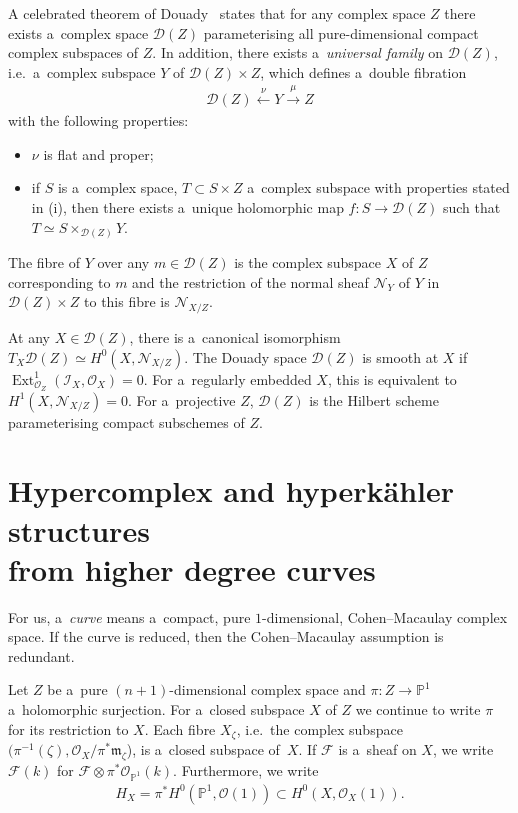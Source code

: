 \documentclass[11pt]{article}
\numberwithin{equation}{section}
\begin{document}
A celebrated theorem of Douady~\cite{Dou} states that for any complex space $Z$ there exists a~complex space
${\mathcal{D}}(Z)$ parameterising all pure-dimensional compact complex subspaces of $Z$.
In addition, there exists a~{\em universal family} on ${\mathcal{D}}(Z)$, i.e.\
a~complex subspace $Y$ of ${\mathcal{D}}(Z)\times Z$, which def\/ines a~double f\/ibration
\begin{gather}
{\mathcal{D}}(Z)\stackrel{\nu}{\longleftarrow} Y \stackrel{\mu}{\longrightarrow} Z
\label{seqq0}
\end{gather}
with the following properties:
\begin{itemize}\itemsep=0pt
\item[(i)] $\nu$ is f\/lat and proper; \item[(ii)] if $S$ is a~complex space, $T\subset S\times Z$ a~complex subspace with
properties stated in (i), then there exists a~unique holomorphic map $f:S\to {\mathcal{D}}(Z)$ such that $T\simeq
S\times_{{\mathcal{D}}(Z)} Y$.
\end{itemize}
The f\/ibre of $Y$ over any $m\in {\mathcal{D}}(Z)$ is the complex subspace $X$ of $Z$ corresponding to $m$ and the
restriction of the normal sheaf ${\mathcal{N}}_Y$ of $Y$ in ${\mathcal{D}}(Z)\times Z$ to this f\/ibre is
${\mathcal{N}}_{X/Z}$.

At any $X\in {\mathcal{D}}(Z)$, there is a~canonical isomorphism $T_X{\mathcal{D}}(Z)\simeq H^0(X,{\mathcal{N}}_{X/Z})$.
The Douady space ${\mathcal{D}}(Z)$ is smooth at $X$ if $\operatorname{Ext}^1_{{\mathcal{O}}_Z}(
{\mathcal{I}}_X,{\mathcal{O}}_X)=0$.
For a~regularly embedded $X$, this is equivalent to $H^1(X,{\mathcal{N}}_{X/Z})=0$.
For a~projective $Z$, ${\mathcal{D}}(Z)$ is the Hilbert scheme parameterising compact subschemes of $Z$.

\section{Hypercomplex and hyperk\"ahler structures\\ from higher degree curves}\label{hgc}

For us, a~{\em curve} means a~compact, pure $1$-dimensional, Cohen--Macaulay complex space.
If the curve is reduced, then the Cohen--Macaulay assumption is redundant.

Let $Z$ be a~pure $(n+1)$-dimensional complex space and $\pi:Z\to {\mathbb{P}}^1$ a~holomorphic surjection.
For a~closed subspace $X$ of $Z$ we continue to write $\pi$ for its restriction to $X$.
Each f\/ibre $X_\zeta$, i.e.\
the complex subspace $(\pi^{-1}(\zeta), {\mathcal{O}}_X/\pi^\ast\mathfrak{m}_\zeta$), is a~closed subspace of~$X$.
If ${\mathcal{F}}$ is a~sheaf on $X$, we write ${\mathcal{F}}(k)$ for ${\mathcal{F}}\otimes \pi^\ast
{\mathcal{O}}_{{\mathbb{P}}^1}(k)$.
Furthermore, we write
\begin{gather*}
H_X=\pi^\ast H^0({\mathbb{P}}^1,{\mathcal{O}}(1)) \subset H^0(X,{\mathcal{O}}_X(1)).
\end{gather*}
\end{document}

